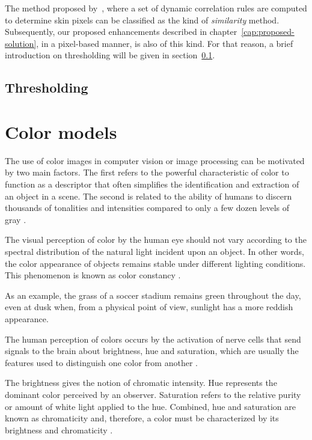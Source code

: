 The method proposed by~\citet{brancati:17}, where a set of dynamic correlation rules are computed to determine skin pixels can be classified as the kind of \emph{similarity} method. Subsequently, our proposed enhancements described in chapter~\ref{cap:proposed-solution}, in a pixel-based manner, is also of this kind. For that reason, a brief introduction on thresholding will be given in section~\ref{sec:thresholding}.


\subsection{Thresholding}
\label{sec:thresholding}


\section{Color models}
\label{sec:color_models}

The use of color images in computer vision or image processing can be motivated by two main factors. The first refers to the powerful characteristic of color to function as a descriptor that often simplifies the identification and extraction of an object in a scene. The second is related to the ability of humans to discern thousands of tonalities and intensities compared to only a few dozen levels of gray \citep{gonzalez:02}.

The visual perception of color by the human eye should not vary according to the spectral distribution of the natural light incident upon an object. In other words, the color appearance of objects remains stable under different lighting conditions. This phenomenon is known as color constancy \citep{gevers:12}.

As an example, the grass of a soccer stadium remains green throughout the day, even at dusk when, from a physical point of view, sunlight has a more reddish appearance.

The human perception of colors occurs by the activation of nerve cells that send signals to the brain about brightness, hue and saturation, which are usually the features used to distinguish one color from another \citep{gonzalez:02}.

The brightness gives the notion of chromatic intensity. Hue represents the dominant color perceived by an observer. Saturation refers to the relative purity or amount of white light applied to the hue. Combined, hue and saturation are known as chromaticity and, therefore, a color must be characterized by its brightness and chromaticity \citep{gonzalez:02}.

